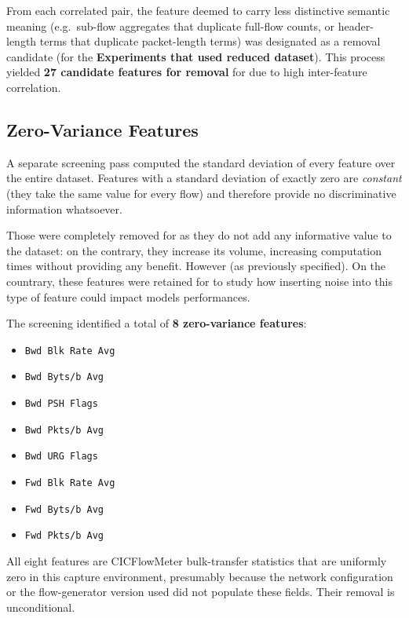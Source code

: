 \documentclass[../main.tex]{subfiles}
\begin{document}
From each correlated pair, the feature deemed to carry less distinctive semantic meaning (e.g.\ sub-flow aggregates that duplicate full-flow counts, or header-length terms that duplicate packet-length terms) was designated as a removal candidate (for the \textbf{Experiments that used reduced dataset}). This process yielded \textbf{27 candidate features for removal} for  due to high inter-feature correlation.

\newpage
\subsection{Zero-Variance Features}
\label{sec:zero-variance}

A separate screening pass computed the standard deviation of every feature over the entire dataset.  Features with a standard deviation of exactly zero are \emph{constant} (they take the same value for every flow) and therefore provide no discriminative information whatsoever.  

Those were completely removed for  as they do not add any informative value to the dataset: on the contrary, they increase its volume, increasing computation times without providing any benefit. However (as previously specified). On the countrary, these features were retained for  to study how inserting noise into this type of feature could impact models performances.

The screening identified a total of \textbf{8 zero-variance features}:

\begin{itemize}
  \item \texttt{Bwd Blk Rate Avg}
  \item \texttt{Bwd Byts/b Avg}
  \item \texttt{Bwd PSH Flags}
  \item \texttt{Bwd Pkts/b Avg}
  \item \texttt{Bwd URG Flags}
  \item \texttt{Fwd Blk Rate Avg}
  \item \texttt{Fwd Byts/b Avg}
  \item \texttt{Fwd Pkts/b Avg}
\end{itemize}

All eight features are CICFlowMeter bulk-transfer statistics that are uniformly
zero in this capture environment, presumably because the network configuration
or the flow-generator version used did not populate these fields.  Their removal
is unconditional.
\end{document}
